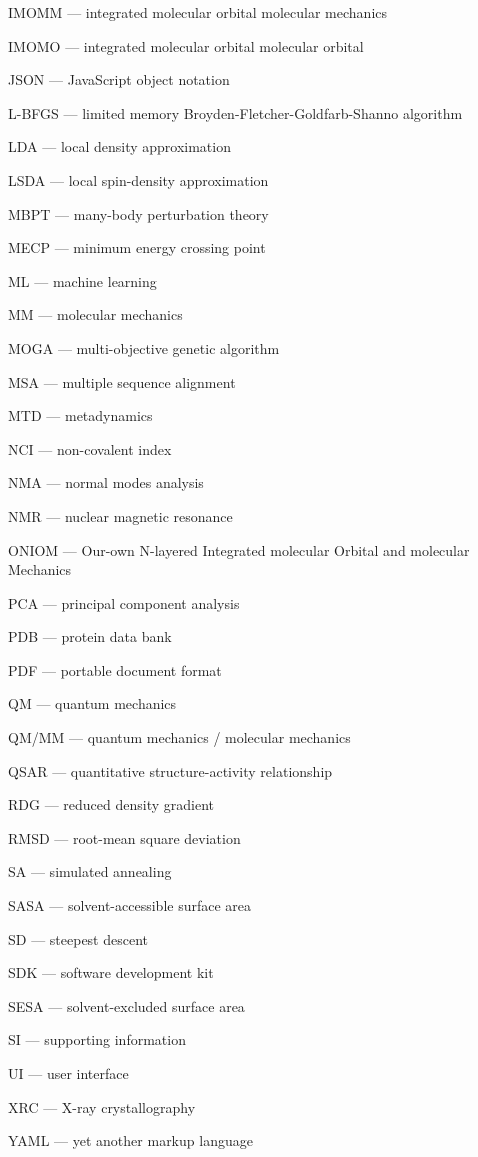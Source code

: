 \textsc{IMOMM} --- integrated molecular orbital molecular mechanics

\textsc{IMOMO} --- integrated molecular orbital molecular orbital

\textsc{JSON} --- JavaScript object notation

\textsc{L-BFGS} --- limited memory Broyden-Fletcher-Goldfarb-Shanno algorithm

\textsc{LDA} --- local density approximation

\textsc{LSDA} --- local spin-density approximation

\textsc{MBPT} --- many-body perturbation theory

\textsc{MECP} --- minimum energy crossing point

\textsc{ML} --- machine learning

\textsc{MM} --- molecular mechanics

\textsc{MOGA} --- multi-objective genetic algorithm

\textsc{MSA} --- multiple sequence alignment

\textsc{MTD} --- metadynamics

\textsc{NCI} --- non-covalent index

\textsc{NMA} --- normal modes analysis

\textsc{NMR} --- nuclear magnetic resonance

\textsc{ONIOM} --- Our-own N-layered Integrated molecular Orbital and molecular Mechanics

\textsc{PCA} --- principal component analysis

\textsc{PDB} --- protein data bank

\textsc{PDF} --- portable document format

\textsc{QM} --- quantum mechanics

\textsc{QM/MM} --- quantum mechanics / molecular mechanics

\textsc{QSAR} --- quantitative structure-activity relationship

\textsc{RDG} --- reduced density gradient

\textsc{RMSD} --- root-mean square deviation

\textsc{SA} --- simulated annealing

\textsc{SASA} --- solvent-accessible surface area

\textsc{SD} --- steepest descent

\textsc{SDK} --- software development kit

\textsc{SESA} --- solvent-excluded surface area

\textsc{SI} --- supporting information

\textsc{UI} --- user interface

\textsc{XRC} --- X-ray crystallography

\textsc{YAML} --- yet another markup language